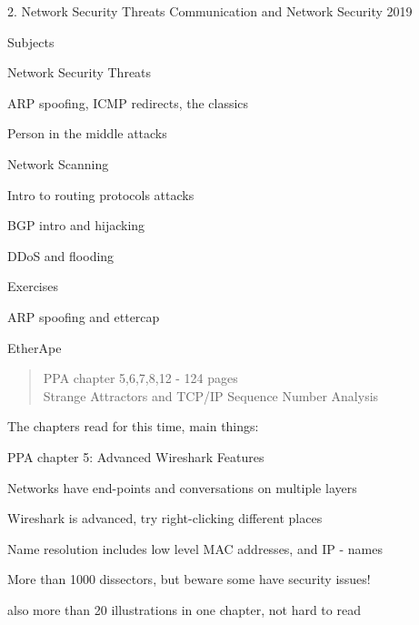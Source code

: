 \documentclass[Screen16to9,17pt]{foils}
\begin{document}
\mytitlepage
{2. Network Security Threats}
{Communication and Network Security 2019}


\begin{list1}
\item Subjects
\begin{list2}
\item Network Security Threats
\item ARP spoofing, ICMP redirects, the classics
\item Person in the middle attacks
\item Network Scanning
\item Intro to routing protocols attacks
\item BGP intro and hijacking
\item DDoS and flooding
\end{list2}
\item Exercises
\begin{list2}
\item ARP spoofing and ettercap
\item EtherApe
\end{list2}
\end{list1}



\begin{quote}
PPA chapter 5,6,7,8,12 - 124 pages\\
Strange Attractors and TCP/IP Sequence Number Analysis
\end{quote}

\begin{list1}
\item The chapters read for this time, main things:
\item PPA chapter 5: Advanced Wireshark Features
\begin{list2}
\item Networks have end-points and conversations on multiple layers
\item Wireshark is advanced, try right-clicking different places
\item Name resolution includes low level MAC addresses, and IP - names
\item More than 1000 dissectors, but beware some have security issues!
\end{list2}
\item also more than 20 illustrations in one chapter, not hard to read
\end{list1}
\end{document}
